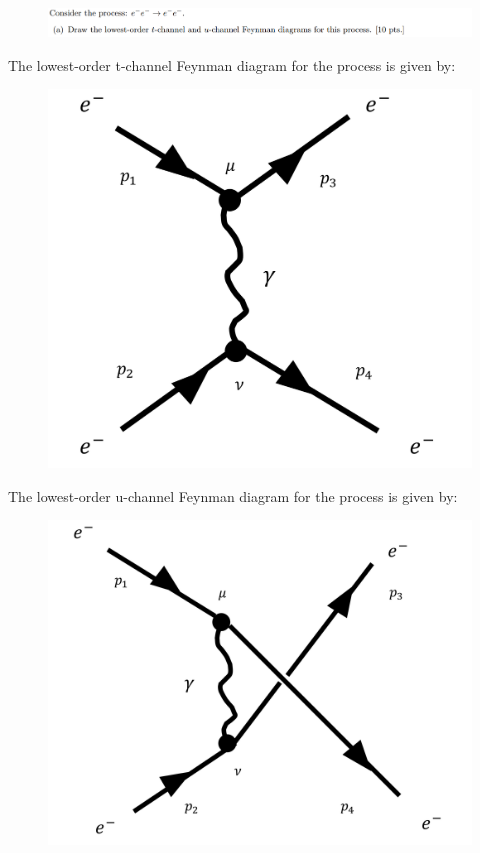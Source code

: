 \documentclass[11pt]{article}
\theoremstyle{definition}
\numberwithin{equation}{section}
\begin{document}
\begin{figure}[H]
    \centering
    \includegraphics[scale = 0.4]{2a.png}
\end{figure}

The lowest-order t-channel Feynman diagram for the process is given by:

\begin{figure}[H]
    \centering
    \includegraphics[scale = 0.4]{moller t-channel.png}
\end{figure}


The lowest-order u-channel Feynman diagram for the process is given by:

\begin{figure}[H]
    \centering
    \includegraphics[scale = 0.4]{moller u-channel.png}
\end{figure}
\end{document}
